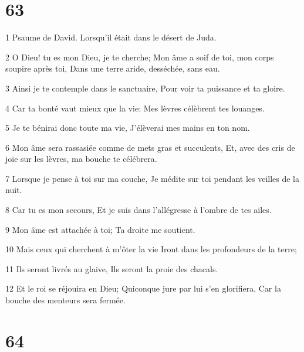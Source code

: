 \chapter{63}

\par 1 Psaume de David. Lorsqu'il était dans le désert de Juda.
\par 2 O Dieu! tu es mon Dieu, je te cherche; Mon âme a soif de toi, mon corps soupire après toi, Dans une terre aride, desséchée, sans eau.
\par 3 Ainsi je te contemple dans le sanctuaire, Pour voir ta puissance et ta gloire.
\par 4 Car ta bonté vaut mieux que la vie: Mes lèvres célèbrent tes louanges.
\par 5 Je te bénirai donc toute ma vie, J'élèverai mes mains en ton nom.
\par 6 Mon âme sera rassasiée comme de mets gras et succulents, Et, avec des cris de joie sur les lèvres, ma bouche te célébrera.
\par 7 Lorsque je pense à toi sur ma couche, Je médite sur toi pendant les veilles de la nuit.
\par 8 Car tu es mon secours, Et je suis dans l'allégresse à l'ombre de tes ailes.
\par 9 Mon âme est attachée à toi; Ta droite me soutient.
\par 10 Mais ceux qui cherchent à m'ôter la vie Iront dans les profondeurs de la terre;
\par 11 Ils seront livrés au glaive, Ils seront la proie des chacals.
\par 12 Et le roi se réjouira en Dieu; Quiconque jure par lui s'en glorifiera, Car la bouche des menteurs sera fermée.

\chapter{64}

